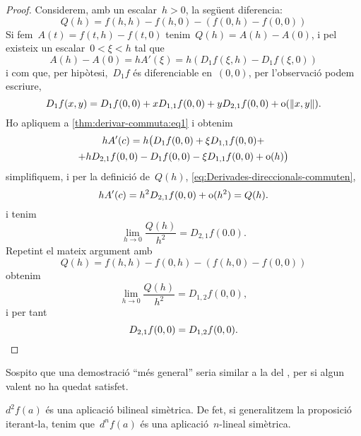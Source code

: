 \documentclass[../../main.tex]{subfiles}
\begin{document}
\begin{theorem}
\begin{proof}
        Considerem, amb un escalar~\(h>0\), la següent diferencia:
        \begin{equation}\label{eq:Derivades-direccionals-commuten}
        Q(h)=f(h,h)-f(h,0)-(f(0,h)-f(0,0))
        \end{equation}
        Si fem~\(A(t)=f(t,h)-f(t,0)\) tenim~\(Q(h)=A(h)-A(0)\), i pel  existeix un escalar~\(0<\xi<h\) tal que
        \begin{equation}\label{thm:derivar-commuta:eq1}
        A(h)-A(0)=hA'(\xi)=h(D_{1}f(\xi,h)-D_{1}f(\xi,0))
        \end{equation}
        i com que, per hipòtesi,~\(D_{1}f\) és diferenciable en~\((0,0)\), per l'observació  podem escriure,
        \[
            D_{1}f(x,y)=D_{1}f(0,0)+xD_{1,1}f(0,0)+yD_{2,1}f(0,0)+\omicron(\norm{x,y}).
        \]
        Ho apliquem a \eqref{thm:derivar-commuta:eq1} i obtenim
        \begin{multline*}
        hA'(c)=h\big(D_{1}f(0,0)+\xi D_{1,1}f(0,0)+\\+hD_{2,1}f(0,0)-D_{1}f(0,0)-\xi D_{1,1}f(0,0)+\operatorname{o}(h)\big)
        \end{multline*}
        simplifiquem, i per la definició de~\(Q(h)\), \eqref{eq:Derivades-direccionals-commuten},
        \[
            hA'(c)=h^{2}D_{2,1}f(0,0)+\operatorname{o}(h^{2})=Q(h).
        \]
        i tenim
        \[
            \lim_{h\to0}\frac{Q(h)}{h^{2}}=D_{2,1}f(0.0).
        \]
        Repetint el mateix argument amb
        \[
            Q(h)=f(h,h)-f(0,h)-(f(h,0)-f(0,0))
        \]
        obtenim
        \[
            \lim_{h\to0}\frac{Q(h)}{h^{2}}=D_{1,2}f(0,0),
        \]
        i per tant
        \[
            D_{2,1}f(0,0)=D_{1,2}f(0,0).\qedhere
        \]
    \end{proof}
    \begin{note}
        Sospito que una demostració ``més general'' seria similar a la del , per si algun valent no ha quedat satisfet.
    \end{note}
    \end{theorem}
    \begin{corollary}\label{obs:diferencial-bilineal}
        \(d^{2}f(a)\) és una aplicació bilineal simètrica.
        De fet, si generalitzem la proposició iterant-la, tenim que~\(d^{n}f(a)\) és una aplicació~\(n\)-lineal simètrica.
    \end{corollary}
\end{document}
